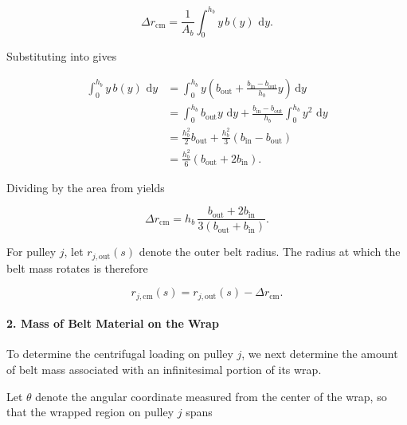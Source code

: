 \documentclass[11pt]{article}
\numberwithin{equation}{section}
\newcommand{\dd}{\,\mathrm{d}}
\begin{document}
\begin{equation}
\Delta r_{\mathrm{cm}}
=
\frac{1}{A_b}
\int_0^{h_b} y\,b(y)\,\dd y.
\label{eq:delta_r_cm_def}
\end{equation}

Substituting  into  gives

\begin{align}
\int_0^{h_b} y\,b(y)\,\dd y
&=
\int_0^{h_b}
y\left(
b_{\mathrm{out}}
+
\frac{b_{\mathrm{in}} - b_{\mathrm{out}}}{h_b}y
\right)\dd y
\nonumber\\[6pt]
&=
\int_0^{h_b} b_{\mathrm{out}} y\,\dd y
+
\frac{b_{\mathrm{in}} - b_{\mathrm{out}}}{h_b}
\int_0^{h_b} y^2\,\dd y
\nonumber\\[6pt]
&=
\frac{h_b^2}{2}b_{\mathrm{out}}
+
\frac{h_b^2}{3}\left(b_{\mathrm{in}} - b_{\mathrm{out}}\right)
\nonumber\\[6pt]
&=
\frac{h_b^2}{6}
\left(b_{\mathrm{out}} + 2b_{\mathrm{in}}\right).
\label{eq:centroid_integral_steps}
\end{align}

Dividing by the area from  yields

\begin{equation}
\Delta r_{\mathrm{cm}}
=
h_b\,
\frac{b_{\mathrm{out}} + 2b_{\mathrm{in}}}
{3\left(b_{\mathrm{out}} + b_{\mathrm{in}}\right)}.
\label{eq:delta_r_cm_trap}
\end{equation}

For pulley \(j\), let \(r_{j,\mathrm{out}}(s)\) denote the outer belt radius.
The radius at which the belt mass rotates is therefore

\begin{equation}
r_{j,\mathrm{cm}}(s)
=
r_{j,\mathrm{out}}(s) - \Delta r_{\mathrm{cm}}.
\label{eq:rj_cm_definition}
\end{equation}

\paragraph{2. Mass of Belt Material on the Wrap}

To determine the centrifugal loading on pulley \(j\), we next determine
the amount of belt mass associated with an infinitesimal portion of its wrap.

Let \(\theta\) denote the angular coordinate measured from the center of the wrap,
so that the wrapped region on pulley \(j\) spans
\end{document}
